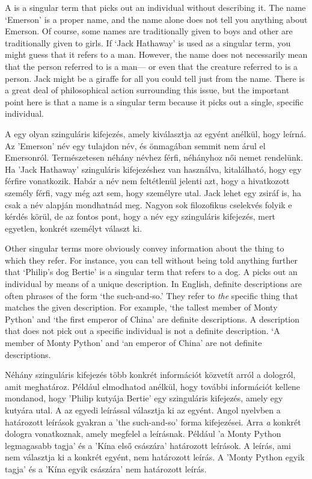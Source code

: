 
A  is a singular term that picks out an individual without describing it. The name `Emerson' is a proper name, and the name alone does not tell you anything about Emerson. Of course, some names are traditionally given to boys and other are traditionally given to girls. If `Jack Hathaway' is used as a singular term, you might guess that it refers to a man. However, the name does not necessarily mean that the person referred to is a man--- or even that the creature referred to is a person. Jack might be a giraffe for all you could tell just from the name. There is a great deal of philosophical action surrounding this issue, but the important point here is that a name is a singular term because it picks out a single, specific individual.

A  egy olyan szinguláris kifejezés, amely kiválasztja az egyént anélkül, hogy leírná. Az ’Emerson’ név egy tulajdon név, és önmagában semmit nem árul el Emersonról. Természetesen néhány névhez férfi, néhányhoz női nemet rendelünk. Ha ’Jack Hathaway’ szinguláris kifejezéshez van használva, kitalálható, hogy egy férfire vonatkozik. Habár a név nem feltétlenül jelenti azt, hogy a hivatkozott személy férfi, vagy még azt sem, hogy személyre utal. Jack lehet egy zsiráf is, ha csak a név alapján mondhatnád meg. Nagyon sok filozofikus cselekvés folyik e kérdés körül, de az fontos pont, hogy a név egy szinguláris kifejezés, mert egyetlen, konkrét személyt választ ki. 

Other singular terms more obviously convey information about the thing to which they refer. For instance, you can tell without being told anything further that `Philip's dog Bertie' is a singular term that refers to a dog. A  picks out an individual by means of a unique description. In English, definite descriptions are often phrases of the form `the such-and-so.' They refer to \emph{the} specific thing that matches the given description. For example, `the tallest member of Monty Python' and `the first emperor of China' are definite descriptions. A description that does not pick out a specific individual is not a definite description. `A member of Monty Python' and `an emperor of China' are not definite descriptions.

Néhány szinguláris kifejezés több konkrét információt közvetít arról a dologról, amit meghatároz. Például elmodhatod anélkül, hogy további információt kellene mondanod, hogy ’Philip kutyája Bertie’ egy szinguláris kifejezés, amely egy kutyára utal. A  az egyedi leírással választja ki az egyént. Angol nyelvben a határozott leírások gyakran a ’the such-and-so’ forma kifejezései. Arra \emph{a} konkrét dologra vonatkoznak, amely megfelel a leírásnak. Például ’a Monty Python legmagasabb tagja’ és a ’Kína első császára’ határozott leírások. A leírás, ami nem választja ki a konkrét egyént, nem határozott leírás. A ’Monty Python egyik tagja’ és a  ’Kína egyik császára’ nem határozott leírás.


